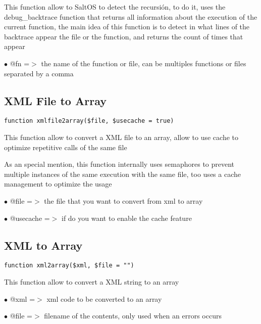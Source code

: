 \documentclass[a4paper]{book}
\begin{document}
This function allow to SaltOS to detect the recursión, to do it, uses the debug\_backtrace
function that returns all information about the execution of the current function, the
main idea of this function is to detect in what lines of the backtrace appear the file
or the function, and returns the count of times that appear

\begin{compactitem}
\item[\color{myblue}$\bullet$] @fn =$>$ the name of the function or file, can be multiples functions or files separated
       by a comma
\end{compactitem}

\hypertarget{toc283}{}
\subsection{XML File to Array}

\begin{lstlisting}
function xmlfile2array($file, $usecache = true)
\end{lstlisting}

This function allow to convert a XML file to an array, allow to use cache to
optimize repetitive calls of the same file

As an special mention, this function internally uses semaphores to prevent
multiple instances of the same execution with the same file, too uses a cache
management to optimize the usage

\begin{compactitem}
\item[\color{myblue}$\bullet$] @file     =$>$ the file that you want to convert from xml to array
\item[\color{myblue}$\bullet$] @usecache =$>$ if do you want to enable the cache feature
\end{compactitem}

\hypertarget{toc284}{}
\subsection{XML to Array}

\begin{lstlisting}
function xml2array($xml, $file = "")
\end{lstlisting}

This function allow to convert a XML string to an array

\begin{compactitem}
\item[\color{myblue}$\bullet$] @xml  =$>$ xml code to be converted to an array
\item[\color{myblue}$\bullet$] @file =$>$ filename of the contents, only used when an errors occurs
\end{compactitem}
\end{document}
